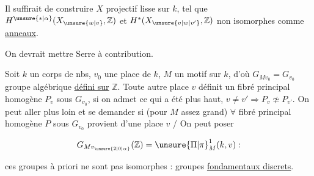 
Il suffirait de construire $X$ projectif lisse sur $k$, tel que $H^{\unsure{*|\alpha}}(X_{\unsure{w|v}},\mathbb{Z})$ et $H^*(X_{\unsure{v|w|v'}},\mathbb{Z})$ non isomorphes comme \uline{anneaux}.


On devrait mettre Serre à contribution.


Soit $k$ un corps de nbs, $v_0$ une place de $k$, $M$ un motif sur $k$, d'où $G_{M v_0}=G_{v_0}$ groupe algébrique \uline{défini sur} $\mathbb{Z}$. Toute autre place  $v$ définit un fibré principal homogène $P_v$ sous $G_{v_0}$,  si on admet ce qui a été   plus haut,  $v\ne v'\Longrightarrow P_v\not\simeq P_{v'}$. On peut aller plus loin et se demander si  (pour $M$ assez grand) \uline{$\forall$} fibré principal homogène $P$ sous $G_{v_0}$ provient d'une place $v$  /  On  peut poser


\[
G_{Mv_{\unsure{2|0|\alpha}}}(\mathbb{Z})=\unsure{\Pi|\pi}^{1}_{M}(k,v) :
\]

ces groupes à priori ne sont pas isomorphes : groupes \uline{fondamentaux  discrets}.
